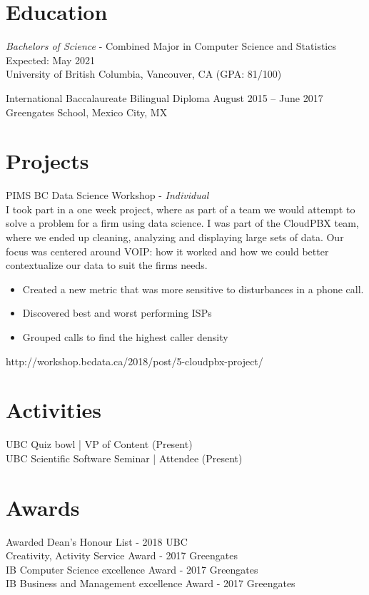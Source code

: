 \documentclass[letter]{res}
\begin{document}
\begin{resume}
\section{Education}
{\sl Bachelors of Science} - Combined Major in Computer Science and Statistics \hfill Expected: May 2021\\
University of British Columbia,  Vancouver, CA \hfill (GPA: 81/100)
  \vspace{-4mm}
  
International Baccalaureate Bilingual Diploma \hfill August 2015 – June 2017\\
Greengates School, Mexico City, MX
 \vspace{-2mm}

\section{Projects}
PIMS BC Data Science Workshop \newline - {\sl Individual} \\
I took part in a one week project, where as part of a team we would attempt to solve a problem for a firm using data science. I was part of the CloudPBX team, where we ended up cleaning, analyzing and displaying large sets of data. Our focus was centered around VOIP: how it worked and how we could better contextualize our data to suit the firms needs. 
\\
\begin{itemize}
 \item Created a new metric that was more sensitive to disturbances in a phone call.
 \item Discovered best and worst performing ISPs
 \item Grouped calls to find the highest caller density
\end{itemize}
http://workshop.bcdata.ca/2018/post/5-cloudpbx-project/

\vspace{-2mm}
\section{Activities} 
 UBC Quiz bowl | VP of Content (Present) \\
 UBC Scientific Software Seminar | Attendee (Present) \\
 
\vspace{-4mm}
\section{Awards} 
 Awarded Dean’s Honour List - 2018 UBC \\
 Creativity, Activity Service Award - 2017 Greengates \\
 IB Computer Science excellence Award - 2017 Greengates \\
 IB Business and Management excellence Award - 2017 Greengates \\

\end{resume}
\end{document}
